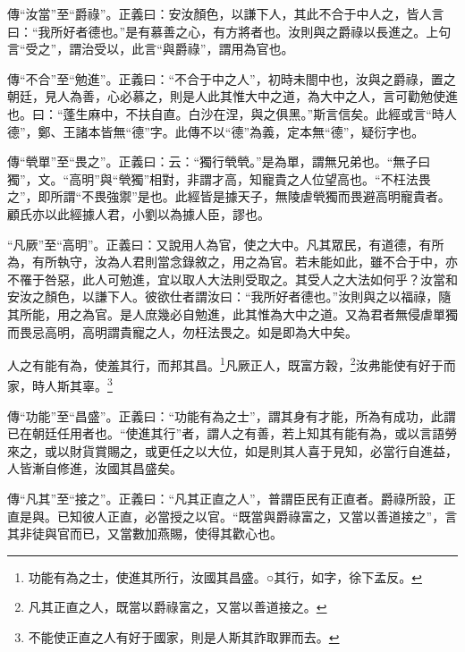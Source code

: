 {\noindent\zhuan{}\fzbyks 傳“汝當”至“爵祿”。正義曰：安汝顏色，以謙下人，其此不合于中人之，皆人言曰：“我所好者德也。”是有慕善之心，有方將者也。汝則與之爵祿以長進之。上句言“受之”，謂治受以，此言“與爵祿”，謂用為官也。 \par}

{\noindent\zhuan{}\fzbyks 傳“不合”至“勉進”。正義曰：“不合于中之人”，初時未閤中也，汝與之爵祿，置之朝廷，見人為善，心必慕之，則是人此其惟大中之道，為大中之人，言可勸勉使進也。曰：“蓬生麻中，不扶自直。白沙在涅，與之俱黑。”斯言信矣。此經或言“時人德”，鄭、王諸本皆無“德”字。此傳不以“德”為義，定本無“德”，疑衍字也。 \par}

{\noindent\zhuan{}\fzbyks 傳“煢單”至“畏之”。正義曰：云：“獨行煢煢。”是為單，謂無兄弟也。“無子曰獨”，文。“高明”與“煢獨”相對，非謂才高，知寵貴之人位望高也。“不枉法畏之”，即所謂“不畏強禦”是也。此經皆是據天子，無陵虐煢獨而畏避高明寵貴者。顧氏亦以此經據人君，小劉以為據人臣，謬也。 \par}

{\noindent\shu{}\fzkt “凡厥”至“高明”。正義曰：又說用人為官，使之大中。凡其眾民，有道德，有所為，有所執守，汝為人君則當念錄敘之，用之為官。若未能如此，雖不合于中，亦不罹于咎惡，此人可勉進，宜以取人大法則受取之。其受人之大法如何乎？汝當和安汝之顏色，以謙下人。彼欲仕者謂汝曰：“我所好者德也。”汝則與之以福祿，隨其所能，用之為官。是人庶幾必自勉進，此其惟為大中之道。又為君者無侵虐單獨而畏忌高明，高明謂貴寵之人，勿枉法畏之。如是即為大中矣。 \par}

人之有能有為，使羞其行，而邦其昌。\footnote{功能有為之士，使進其所行，汝國其昌盛。○其行，如字，徐下孟反。}凡厥正人，既富方穀，\footnote{凡其正直之人，既當以爵祿富之，又當以善道接之。}汝弗能使有好于而家，時人斯其辜。\footnote{不能使正直之人有好于國家，則是人斯其詐取罪而去。}


{\noindent\zhuan{}\fzbyks 傳“功能”至“昌盛”。正義曰：“功能有為之士”，謂其身有才能，所為有成功，此謂已在朝廷任用者也。“使進其行”者，謂人之有善，若上知其有能有為，或以言語勞來之，或以財貨賞賜之，或更任之以大位，如是則其人喜于見知，必當行自進益，人皆漸自修進，汝國其昌盛矣。 \par}

{\noindent\zhuan{}\fzbyks 傳“凡其”至“接之”。正義曰：“凡其正直之人”，普謂臣民有正直者。爵祿所設，正直是與。已知彼人正直，必當授之以官。“既當與爵祿富之，又當以善道接之”，言其非徒與官而已，又當數加燕賜，使得其歡心也。 \par}

